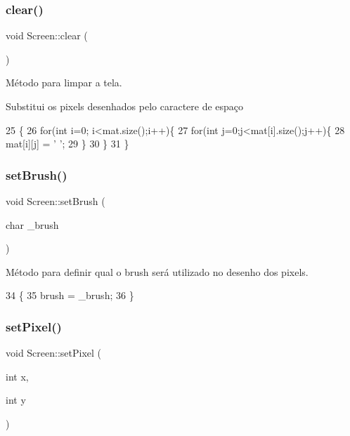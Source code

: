 \subsubsection{\texorpdfstring{clear()}{clear()}}
{\footnotesize\ttfamily void Screen\+::clear (\begin{DoxyParamCaption}{ }\end{DoxyParamCaption})}



Método para limpar a tela. 

Substitui os pixels desenhados pelo caractere de espaço 
\begin{DoxyCode}
25 \{
26     \textcolor{keywordflow}{for}(\textcolor{keywordtype}{int} i=0; i<mat.size();i++)\{
27         \textcolor{keywordflow}{for}(\textcolor{keywordtype}{int} j=0;j<mat[i].size();j++)\{
28             mat[i][j] = \textcolor{charliteral}{' '};
29         \}
30     \}
31 \}
\end{DoxyCode}
\mbox{\label{class_screen_aebc4eb6cb5acf15a0f04c1494622ab23}} 
\subsubsection{\texorpdfstring{set\+Brush()}{setBrush()}}
{\footnotesize\ttfamily void Screen\+::set\+Brush (\begin{DoxyParamCaption}\item[{char}]{\+\_\+brush }\end{DoxyParamCaption})}



Método para definir qual o brush será utilizado no desenho dos pixels. 


\begin{DoxyCode}
34 \{
35     brush = \_brush;
36 \}
\end{DoxyCode}
\mbox{\label{class_screen_ae6bea81c57a22d226507c3c26fa95ee0}} 
\subsubsection{\texorpdfstring{set\+Pixel()}{setPixel()}}
{\footnotesize\ttfamily void Screen\+::set\+Pixel (\begin{DoxyParamCaption}\item[{int}]{x,  }\item[{int}]{y }\end{DoxyParamCaption})}



